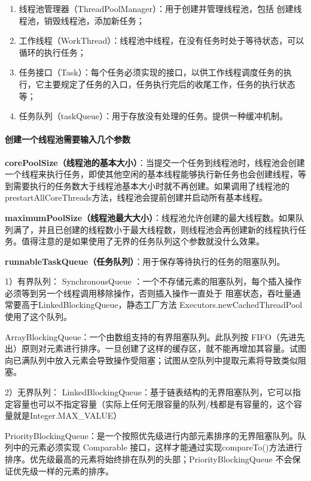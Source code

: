 \documentclass[../../../interview-questions.tex]{subfiles}
\begin{document}
\begin{enumerate}
    \item {线程池管理器（ThreadPoolManager）：用于创建并管理线程池，包括 创建线程池，销毁线程池，添加新任务；}
    \item {工作线程（WorkThread）：线程池中线程，在没有任务时处于等待状态，可以循环的执行任务；}
    \item {任务接口（Task）：每个任务必须实现的接口，以供工作线程调度任务的执行，它主要规定了任务的入口，任务执行完后的收尾工作，任务的执行状态等；}
    \item {任务队列（taskQueue）：用于存放没有处理的任务。提供一种缓冲机制。}
\end{enumerate}


\paragraph{创建一个线程池需要输入几个参数}

\textbf{corePoolSize（线程池的基本大小）}：当提交一个任务到线程池时，线程池会创建一个线程来执行任务，即使其他空闲的基本线程能够执行新任务也会创建线程，等到需要执行的任务数大于线程池基本大小时就不再创建。如果调用了线程池的prestartAllCoreThreads方法，线程池会提前创建并启动所有基本线程。

\textbf{maximumPoolSize（线程池最大大小）}：线程池允许创建的最大线程数。如果队列满了，并且已创建的线程数小于最大线程数，则线程池会再创建新的线程执行任务。值得注意的是如果使用了无界的任务队列这个参数就没什么效果。

\textbf{runnableTaskQueue（任务队列）}：用于保存等待执行的任务的阻塞队列。

1）有界队列：
SynchronousQueue ：一个不存储元素的阻塞队列，每个插入操作必须等到另一个线程调用移除操作，否则插入操作一直处于 阻塞状态，吞吐量通常要高于LinkedBlockingQueue，静态工厂方法 Executors.newCachedThreadPool 使用了这个队列。

ArrayBlockingQueue：一个由数组支持的有界阻塞队列。此队列按 FIFO（先进先出）原则对元素进行排序。一旦创建了这样的缓存区，就不能再增加其容量。试图向已满队列中放入元素会导致操作受阻塞；试图从空队列中提取元素将导致类似阻塞。

2）无界队列：
LinkedBlockingQueue：基于链表结构的无界阻塞队列，它可以指定容量也可以不指定容量（实际上任何无限容量的队列/栈都是有容量的，这个容量就是Integer.MAX\_VALUE）

PriorityBlockingQueue：是一个按照优先级进行内部元素排序的无界阻塞队列。队列中的元素必须实现 Comparable 接口，这样才能通过实现compareTo()方法进行排序。优先级最高的元素将始终排在队列的头部；PriorityBlockingQueue 不会保证优先级一样的元素的排序。
\end{document}

